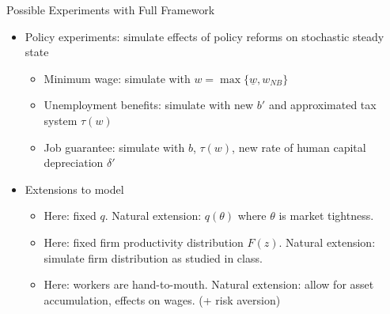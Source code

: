 \documentclass[lualatex]{beamer}
\begin{document}
\begin{frame}{Possible Experiments with Full Framework}
\begin{itemize}

	\item Policy experiments: simulate effects of policy reforms \newline on stochastic steady state

	\begin{itemize}

		\item Minimum wage: simulate with $w = \max\{\underline{w}, w_{NB}\}$

		\item Unemployment benefits: simulate with new $b'$ \newline and approximated tax system $\tau(w)$

		\item Job guarantee: simulate with $b$, $\tau(w)$, \newline new rate of human capital depreciation $\delta'$

	\end{itemize}

	\item Extensions to model

	\begin{itemize}

  	\item Here: fixed $q$. Natural extension: $q(\theta)$ where $\theta$ is market tightness.

		\item Here: fixed firm productivity distribution $F(z)$. \newline Natural extension: simulate firm distribution as studied in class.

		\item Here: workers are hand-to-mouth. \newline Natural extension: allow for asset accumulation, effects on wages. (+ risk aversion)

	\end{itemize}
\end{itemize}
\end{frame}
\end{document}

